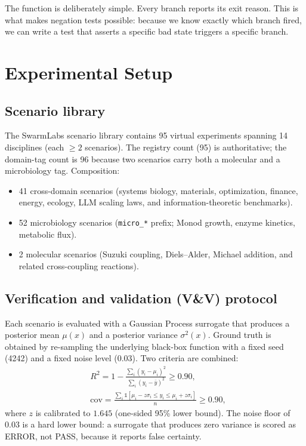 \documentclass[review,3p]{elsarticle}
\begin{document}
The function is deliberately simple. Every branch reports its exit reason. This is what makes negation tests possible: because we know exactly which branch fired, we can write a test that asserts a specific bad state triggers a specific branch.


\section{Experimental Setup}
\label{sec:setup}

\subsection{Scenario library}
\label{sec:library}

The SwarmLabs scenario library contains 95 virtual experiments spanning 14 disciplines (each $\geq 2$ scenarios). The registry count (95) is authoritative; the domain-tag count is 96 because two scenarios carry both a molecular and a microbiology tag. Composition:
\begin{itemize}
    \item 41 cross-domain scenarios (systems biology, materials, optimization, finance, energy, ecology, LLM scaling laws, and information-theoretic benchmarks).
    \item 52 microbiology scenarios (\texttt{micro\_*} prefix; Monod growth, enzyme kinetics, metabolic flux).
    \item 2 molecular scenarios (Suzuki coupling, Diels--Alder, Michael addition, and related cross-coupling reactions).
\end{itemize}

\subsection{Verification and validation (V\&V) protocol}
\label{sec:protocol}

Each scenario is evaluated with a Gaussian Process surrogate that produces a posterior mean $\mu(x)$ and a posterior variance $\sigma^2(x)$. Ground truth is obtained by re-sampling the underlying black-box function with a fixed seed (4242) and a fixed noise level (0.03). Two criteria are combined:
\begin{align}
    &R^2 = 1 - \frac{\sum_i (y_i - \mu_i)^2}{\sum_i (y_i - \bar{y})^2} \ge 0.90, \\
    &\text{cov} = \frac{\sum_i \mathbb{1}[\mu_i - z \sigma_i \le y_i \le \mu_i + z \sigma_i]}{n} \ge 0.90,
\end{align}
where $z$ is calibrated to $1.645$ (one-sided 95\% lower bound). The noise floor of 0.03 is a hard lower bound: a surrogate that produces zero variance is scored as ERROR, not PASS, because it reports false certainty.
\end{document}
